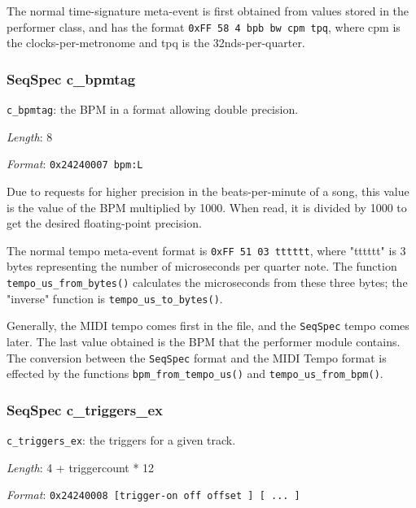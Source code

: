    The normal time-signature meta-event is first obtained from values stored in
   the performer class, and has the format
   \texttt{0xFF 58 4 bpb bw cpm tpq}, where cpm is the clocks-per-metronome
   and tpq is the 32nds-per-quarter.

\subsubsection{SeqSpec c\_bpmtag}
\label{subsubsec:midi_format_track_seqspec_bpmtag}


   \begin{description}
      \item \texttt{c\_bpmtag}: the BPM in a format allowing double
         precision.
      \item \textsl{Length}: 8
      \item \textsl{Format}: \texttt{0x24240007 bpm:L}
   \end{description}

   Due to requests for higher precision in the beats-per-minute of a song, this
   value is the value of the BPM multiplied by 1000.
   When read, it is divided by 1000 to get the desired floating-point precision.

   The normal tempo meta-event format is
   \texttt{0xFF 51 03 tttttt}, where "tttttt" is 3 bytes representing the number
   of microseconds per quarter note.
   The function \texttt{tempo\_us\_from\_bytes()} calculates the microseconds
   from these three bytes; the "inverse" function is
   \texttt{tempo\_us\_to\_bytes()}.

   Generally, the MIDI tempo comes first in the file, and the
   \texttt{SeqSpec} tempo comes later.
   The last value obtained is the BPM that the performer module contains.
   The conversion between the
   \texttt{SeqSpec} format and the MIDI Tempo format is
   effected by the functions
   \texttt{bpm\_from\_tempo\_us()} and \texttt{tempo\_us\_from\_bpm()}.

\subsubsection{SeqSpec c\_triggers\_ex}
\label{subsubsec:midi_format_track_seqspec_triggers_ex}


   \begin{description}
      \item \texttt{c\_triggers\_ex}: the triggers for a given track.
      \item \textsl{Length}: 4 + triggercount * 12
      \item \textsl{Format}: \texttt{0x24240008 [trigger-on off offset ] [ ... ]}
   \end{description}

